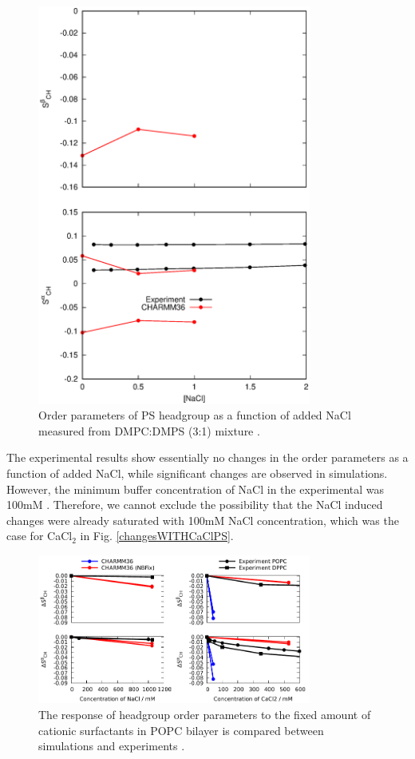 \documentclass[aps,prl,superscriptaddress,twocolumn]{revtex4}
\begin{document}
\begin{figure}[]
  \centering
  \includegraphics[width=9.0cm]{../Figs/PSresponseTONaCl.eps}
  \caption{\label{PSresponseTONaClDMPC}
    Order parameters of PS headgroup as a function of added NaCl measured from DMPC:DMPS (3:1) mixture \cite{roux86}.
  }
\end{figure}
The experimental results show essentially no changes in the order parameters as a function of
added NaCl, while significant changes are observed in simulations. However,
the minimum buffer concentration of NaCl in the experimental was 100mM \cite{roux86}.
Therefore, we cannot exclude the possibility that the NaCl induced changes were already
saturated with 100mM NaCl concentration, which was the case for CaCl$_2$ in Fig. \ref{changesWITHCaClPS}.



\begin{figure}[]
  \centering
  \includegraphics[width=9.0cm]{../Figs/OP_CHARMM_CaCl_POPC_NBFix.pdf}
  \caption{\label{OP_CHARMM_CaCl_POPC_NBFix}
  The response of headgroup order parameters to the fixed amount of cationic surfactants in
  POPC bilayer is compared between simulations and experiments \cite{scherer89}.}
\end{figure}
\end{document}
